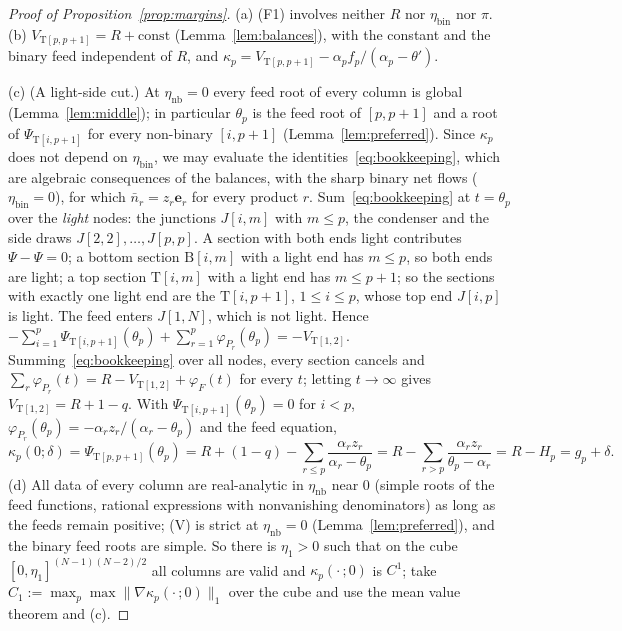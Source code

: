 \documentclass[11pt,a4paper]{report}
\newcommand{\bfe}{\mathbf e}
\newcommand{\Ts}{\mathrm T}
\newcommand{\Bs}{\mathrm B}
\begin{document}
\begin{proof}[Proof of Proposition~\ref{prop:margins}]
(a) (F1) involves neither \(R\) nor \(\eta_{\mathrm{bin}}\) nor \(\pi\). (b) \(V_{\Ts[p,p+1]}=R+\mathrm{const}\) (Lemma~\ref{lem:balances}), with
the constant and the binary feed independent of \(R\), and \(\kappa_p=V_{\Ts[p,p+1]}-\alpha_pf_p/(\alpha_p-\theta')\).

(c) (A light-side cut.) At \(\eta_{\mathrm{nb}}=0\) every feed root of every column is global (Lemma~\ref{lem:middle}); in particular
\(\theta_p\) is the feed root of \([p,p+1]\) and a root of \(\Psi_{\Ts[i,p+1]}\) for every non-binary \([i,p+1]\) (Lemma~\ref{lem:preferred}).
Since \(\kappa_p\) does not depend on \(\eta_{\mathrm{bin}}\), we may evaluate the identities~\eqref{eq:bookkeeping}, which are algebraic
consequences of the balances, with the sharp binary net flows (\(\eta_{\mathrm{bin}}=0\)), for which \(\bar n_r=z_r\bfe_r\) for every product
\(r\). Sum~\eqref{eq:bookkeeping} at \(t=\theta_p\) over the \emph{light} nodes: the junctions \(J[i,m]\) with \(m\le p\), the condenser
and the side draws \(J[2,2],\dots,J[p,p]\). A section with both ends light contributes \(\Psi-\Psi=0\); a bottom section
\(\Bs[i,m]\) with a light end has \(m\le p\), so both ends are light; a top section \(\Ts[i,m]\) with a light end has \(m\le p+1\); so the
sections with exactly one light end are the \(\Ts[i,p+1]\), \(1\le i\le p\), whose top end \(J[i,p]\) is light. The feed enters \(J[1,N]\),
which is not light. Hence \(-\sum_{i=1}^p\Psi_{\Ts[i,p+1]}(\theta_p)+\sum_{r=1}^p\varphi_{P_r}(\theta_p)=-V_{\Ts[1,2]}\). Summing~\eqref{eq:bookkeeping}
over all nodes, every section cancels and \(\sum_r\varphi_{P_r}(t)=R-V_{\Ts[1,2]}+\varphi_F(t)\) for every \(t\); letting \(t\to\infty\) gives
\(V_{\Ts[1,2]}=R+1-q\). With \(\Psi_{\Ts[i,p+1]}(\theta_p)=0\) for \(i<p\),
\(\varphi_{P_r}(\theta_p)=-\alpha_rz_r/(\alpha_r-\theta_p)\) and the feed equation,
\[\kappa_p(0;\delta)=\Psi_{\Ts[p,p+1]}(\theta_p)=R+(1-q)-\sum_{r\le p}\frac{\alpha_rz_r}{\alpha_r-\theta_p}=R-\sum_{r>p}\frac{\alpha_rz_r}{\theta_p-\alpha_r}=R-H_p=g_p+\delta .\]
(d) All data of every column are real-analytic in \(\eta_{\mathrm{nb}}\) near \(0\) (simple roots of the feed functions, rational
expressions with nonvanishing denominators) as long as the feeds remain positive; (V) is strict at \(\eta_{\mathrm{nb}}=0\)
(Lemma~\ref{lem:preferred}), and the binary feed roots are simple. So there is \(\eta_1>0\) such that on the cube
\([0,\eta_1]^{(N-1)(N-2)/2}\) all columns are valid and \(\kappa_p(\cdot\,;0)\) is \(C^1\); take \(C_1:=\max_p\max\|\nabla\kappa_p(\cdot\,;0)\|_1\)
over the cube and use the mean value theorem and (c).
\end{proof}
\end{document}
